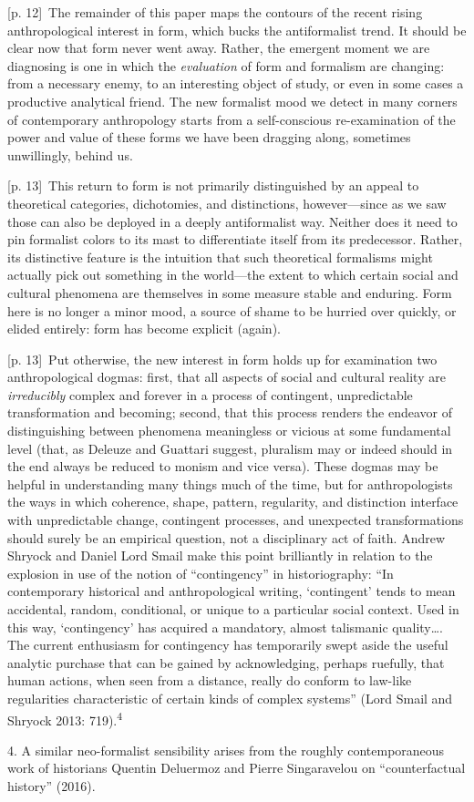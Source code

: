 \documentclass[10pt,a4paper]{article}
\begin{document}
{\scriptsize\color{gray} [p. 12]}\ The remainder of this paper maps the contours of the recent rising anthropological interest in form, which bucks the antiformalist trend. It should be clear now that form never went away. Rather, the emergent moment we are diagnosing is one in which the \textit{evaluation} of form and formalism are changing: from a necessary enemy, to an interesting object of study, or even in some cases a productive analytical friend. The new formalist mood we detect in many corners of contemporary anthropology starts from a self-conscious re-examination of the power and value of these forms we have been dragging along, sometimes unwillingly, behind us.\par
{\scriptsize\color{gray} [p. 13]}\ This return to form is not primarily distinguished by an appeal to theoretical categories, dichotomies, and distinctions, however—since as we saw those can also be deployed in a deeply antiformalist way. Neither does it need to pin formalist colors to its mast to differentiate itself from its predecessor. Rather, its distinctive feature is the intuition that such theoretical formalisms might actually pick out something in the world—the extent to which certain social and cultural phenomena are themselves in some measure stable and enduring. Form here is no longer a minor mood, a source of shame to be hurried over quickly, or elided entirely: form has become explicit (again).\par
{\scriptsize\color{gray} [p. 13]}\ Put otherwise, the new interest in form holds up for examination two anthropological dogmas: first, that all aspects of social and cultural reality are \textit{irreducibly} complex and forever in a process of contingent, unpredictable transformation and becoming; second, that this process renders the endeavor of distinguishing between phenomena meaningless or vicious at some fundamental level (that, as Deleuze and Guattari suggest, pluralism may or indeed should in the end always be reduced to monism and vice versa). These dogmas may be helpful in understanding many things much of the time, but for anthropologists the ways in which coherence, shape, pattern, regularity, and distinction interface with unpredictable change, contingent processes, and unexpected transformations should surely be an empirical question, not a disciplinary act of faith. Andrew Shryock and Daniel Lord Smail make this point brilliantly in relation to the explosion in use of the notion of “contingency” in historiography: “In contemporary historical and anthropological writing, ‘contingent’ tends to mean accidental, random, conditional, or unique to a particular social context. Used in this way, ‘contingency’ has acquired a mandatory, almost talismanic quality…. The current enthusiasm for contingency has temporarily swept aside the useful analytic purchase that can be gained by acknowledging, perhaps ruefully, that human actions, when seen from a distance, really do conform to law-like regularities characteristic of certain kinds of complex systems” (Lord Smail and Shryock 2013: 719).\textsuperscript{4}\par{\small 4. A similar neo-formalist sensibility arises from the roughly contemporaneous work of historians Quentin Deluermoz and Pierre Singaravelou on “counterfactual history” (2016).\par}
\end{document}
